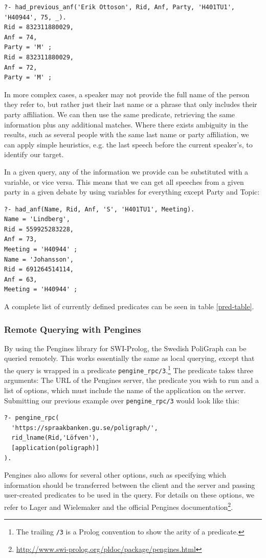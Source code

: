 \begin{lstlisting}
?- had_previous_anf('Erik Ottoson', Rid, Anf, Party, 'H401TU1', 'H40944', 75, _).
Rid = 832311880029,
Anf = 74,
Party = 'M' ;
Rid = 832311880029,
Anf = 72,
Party = 'M' ;
\end{lstlisting}
%
In more complex cases, a speaker may not provide the full name of the person they refer to, but rather just their last name or a phrase that only includes their party affiliation. We can then use the same predicate, retrieving the same information plus any additional matches. Where there exists ambiguity in the results, such as several people with the same last name or party affiliation, we can apply simple heuristics, e.g. the last speech before the current speaker's, to identify our target.

In a given query, any of the information we provide can be substituted with a variable, or vice versa. This means that we can get all speeches from a given party in a given debate by using variables for everything except Party and Topic:

\begin{lstlisting}
?- had_anf(Name, Rid, Anf, 'S', 'H401TU1', Meeting).
Name = 'Lindberg',
Rid = 559925283228,
Anf = 73,
Meeting = 'H40944' ;
Name = 'Johansson',
Rid = 691264514114,
Anf = 63,
Meeting = 'H40944' ;
\end{lstlisting}
%
A complete list of currently defined predicates can be seen in table \ref{pred-table}. 

\subsubsection{Remote Querying with Pengines}

By using the Pengines library for SWI-Prolog, the Swedish PoliGraph can be queried remotely. This works essentially the same as local querying, except that the query is wrapped in a predicate \texttt{pengine\_rpc/3}.\footnote{The trailing \texttt{/3} is a Prolog convention to show the arity of a predicate.} The predicate takes three arguments: The URL of the Pengines server, the predicate you wish to run and a list of options, which must include the name of the application on the server. Submitting our previous example over \texttt{pengine\_rpc/3} would look like this:

\begin{lstlisting}
?- pengine_rpc(
  'https://spraakbanken.gu.se/poligraph/',
  rid_lname(Rid,'Löfven'),
  [application(poligraph)]
).
\end{lstlisting}
%
Pengines also allows for several other options, such as specifying which information should be transferred between the client and the server and passing user-created predicates to be used in the query. For details on these options, we refer to Lager and Wielemaker \cite{lager_pengines_2014} and the official Pengines documentation\footnote{\url{http://www.swi-prolog.org/pldoc/package/pengines.html}}.



